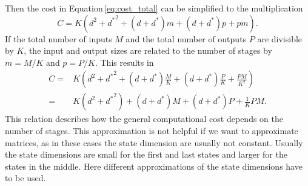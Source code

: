 \documentclass[doctype=mastersthesis,BCOR=15mm,biblatex]{ldvbook}%
\newcommand{\da}{d^*} %
\begin{document}
Then the cost in Equation\,\ref{eq:cost_total} can be simplified to the multiplication
\begin{equation}
C = K(d^2 + {\da}^2 + (d+\da)m +(d+\da)p +pm) 
.
\end{equation}
If the total number of inputs $M$ and the total number of outputs $P$ are divisible by $K$, the input and output sizes are related to the number of stages by $m = M/K$ and $p=P/K$.
This results in
\begin{align}
C =& K(d^2 + {\da}^2 + (d+\da)\frac{M}{K} +(d+\da)\frac{P}{K} +\frac{PM}{K^2}) \\
=&
K(d^2 + {\da}^2) + (d+\da)M +(d+\da)P +\frac{1}{K}PM 
.
\end{align}
This relation describes how the general computational cost depends on the number of stages.
This approximation is not helpful if we want to approximate matrices, as in these cases the state dimension are usually not constant.
Usually the state dimensions are small for the first and last states and larger for the states in the middle.
Here different approximations of the state dimensions have to be used.
\end{document}
